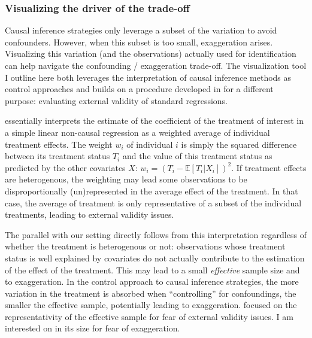 \documentclass[usletter, 12pt]{article}
\begin{document}
			\subsubsection{Visualizing the driver of the trade-off}
		
				Causal inference strategies only leverage a subset of the variation to avoid confounders. However, when this subset is too small, exaggeration arises. Visualizing this variation (and the observations) actually used for identification can help navigate the confounding / exaggeration trade-off. The visualization tool I outline here both leverages the interpretation of causal inference methods as control approaches and builds on a procedure developed in \cite{aronow_does_2016} for a different purpose: evaluating external validity of standard regressions.
				
				\cite{aronow_does_2016} essentially interprets the estimate of the coefficient of the treatment of interest in a simple linear non-causal regression as a weighted average of individual treatment effects. The weight $w_{i}$ of individual $i$ is simply the squared difference between its treatment status $T_{i}$ and the value of this treatment status as predicted by the other covariates $X$: $w_{i} = (T_{i} - \mathbb{E}[T_{i} | X_{i}])^{2}$. If treatment effects are heterogenous, the weighting may lead some observations to be disproportionally (un)represented in the average effect of the treatment. %
				In that case, the average of treatment is only representative of a subset of the individual treatments, leading to external validity issues. 
				
				The parallel with our setting directly follows from this interpretation regardless of whether the treatment is heterogenous or not: observations whose treatment status is well explained by covariates do not actually contribute to the estimation of the effect of the treatment. This may lead to a small \textit{effective} sample size and to exaggeration. In the control approach to causal inference strategies, the more variation in the treatment is absorbed when ``controlling'' for confoundings, the smaller the effective sample, potentially leading to exaggeration. \cite{aronow_does_2016} focused on the representativity of the effective sample for fear of external validity issues. I am interested on in its size for fear of exaggeration.
				
\end{document}
